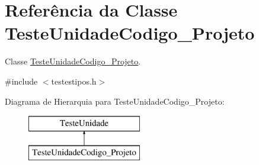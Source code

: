 \hypertarget{class_teste_unidade_codigo___projeto}{
\section{\-Referência da \-Classe \-Teste\-Unidade\-Codigo\-\_\-\-Projeto}
\label{class_teste_unidade_codigo___projeto}
}


\-Classe \hyperlink{class_teste_unidade_codigo___projeto}{\-Teste\-Unidade\-Codigo\-\_\-\-Projeto}.  




{\ttfamily \#include $<$testestipos.\-h$>$}

\-Diagrama de \-Hierarquia para \-Teste\-Unidade\-Codigo\-\_\-\-Projeto\-:\begin{figure}[H]
\begin{center}
\leavevmode
\includegraphics[height=2.000000cm]{class_teste_unidade_codigo___projeto}
\end{center}
\end{figure}
